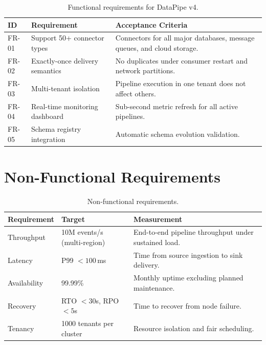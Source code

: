 \documentclass[
    language=english,
    doctype=technical-report,
    institution=none,
    titlestyle=book,
    oneside,
]{../../omnilatex}
\begin{document}
\begin{table}[htbp]
    \centering
    \caption{Functional requirements for DataPipe v4.}
    \label{tab:func-req}
    \begin{tabular}{@{}p{2cm}p{4cm}p{5cm}@{}}
        \toprule
        ID & Requirement & Acceptance Criteria \\
        \midrule
        FR-01 & Support 50+ connector types & Connectors for all major
            databases, message queues, and cloud storage. \\
        FR-02 & Exactly-once delivery semantics & No duplicates under
            consumer restart and network partitions. \\
        FR-03 & Multi-tenant isolation & Pipeline execution in one tenant
            does not affect others. \\
        FR-04 & Real-time monitoring dashboard & Sub-second metric
            refresh for all active pipelines. \\
        FR-05 & Schema registry integration & Automatic schema evolution
            validation. \\
        \bottomrule
    \end{tabular}
\end{table}

\section{Non-Functional Requirements}

\begin{table}[htbp]
    \centering
    \caption{Non-functional requirements.}
    \label{tab:nfr}
    \begin{tabular}{@{}p{3cm}p{4cm}p{4cm}@{}}
        \toprule
        Requirement & Target & Measurement \\
        \midrule
        Throughput & 10M events/s (multi-region) & End-to-end pipeline
            throughput under sustained load. \\
        Latency & P99 $< 100$\,ms & Time from source ingestion to sink
            delivery. \\
        Availability & 99.99\% & Monthly uptime excluding planned
            maintenance. \\
        Recovery & RTO $< 30$s, RPO $< 5$s & Time to recover from node
            failure. \\
        Tenancy & 1000 tenants per cluster & Resource isolation and
            fair scheduling. \\
        \bottomrule
    \end{tabular}
\end{table}
\end{document}
